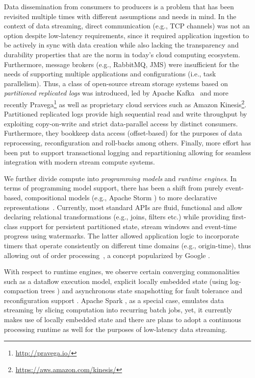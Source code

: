 Data dissemination from consumers to producers is a problem that has been revisited multiple times with different assumptions and needs in mind. In the context of data streaming, direct communication (e.g., TCP channels) was not an option despite low-latency requirements, since it required application ingestion to be actively in sync with data creation while also lacking the transparency and durability properties that are the norm in today's cloud computing ecosystem. Furthermore, message brokers (e.g., \textsf{RabbitMQ}, \textsf{JMS}) were insufficient for the needs of supporting multiple applications and configurations (i.e., task parallelism). Thus, a class of open-source stream storage systems based on \emph{partitioned replicated logs} was introduced, led by \textsf{Apache Kafka}~\cite{kreps2011kafka} and more recently \textsf{Pravega}\footnote{\url{http://pravega.io/}} as well as proprietary cloud services such as \textsf{Amazon Kinesis}\footnote{\url{https://aws.amazon.com/kinesis/}}. Partitioned replicated logs provide high sequential read and write throughput by exploiting copy-on-write and strict data-parallel access by distinct consumers. Furthermore, they bookkeep data access (offset-based) for the purposes of data reprocessing, reconfiguration and roll-backs among others. Finally, more effort has been put to support transactional logging and repartitioning allowing for seamless integration with modern stream compute systems.

 We further divide compute into \emph{programming models} and \emph{runtime engines}. In terms of programming model support, there has been a shift from purely event-based, compositional models (e.g., \textsf{Apache Storm} \cite{toshniwal_et_al_2014}) to more declarative representations~\cite{carbone_et_al_2015,akidau2015dataflow,zaharia_et_al_2013}. Currently, most standard APIs are fluid, functional and allow declaring relational transformations (e.g., joins, filters etc.) while providing first-class support for persistent partitioned state, stream windows and event-time progress using watermarks. The latter allowed application logic to incorporate timers that operate consistently on different time domains (e.g., origin-time), thus allowing out of order processing~\cite{li2008out},  a concept popularized by Google \cite{millwheel,akidau2015dataflow}.

With respect to runtime engines, we observe certain converging commonalities such as a dataflow execution model, explicit locally embedded state (using log-compaction trees \cite{CUSTOM:web/rocksdb}) and asynchronous state snapshotting for fault tolerance and reconfiguration support \cite{state2017carbone,jacques2016consistent}. Apache Spark \cite{zaharia_et_al_2013}, as a special case, emulates data streaming by slicing computation into recurring batch jobs, yet, it currently makes use of locally embedded state and there are plans to adopt a continuous processing runtime as well for the purposes of low-latency data streaming.

